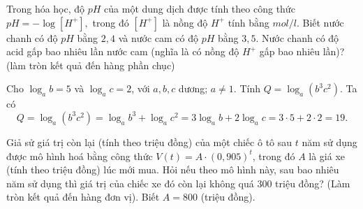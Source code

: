 \begin{bt}%
Trong hóa học, độ $ pH$ của một dung dịch được tính theo công thức $ pH=-\log\left[H^+\right],$ trong đó $\left[H^+\right]$ là nồng độ $H^+$ tính bằng $ mol/l$. Biết nước chanh có độ $ pH$ bằng $ 2{,}4$ và nước cam có độ $ pH$ bằng $ 3{,}5$. Nước chanh có độ acid gấp bao nhiêu lần nước cam (nghĩa là có nồng độ $H^+$ gấp bao nhiêu lần)? (làm tròn kết quả đến hàng phần chục)
\end{bt}

\begin{bt}%
Cho $\log_ab=5$ và $\log_ac=2$, với $ a,b,c$ dương; $ a\ne 1$. Tính $ Q=\log_a\left(b^3c^2\right)$.
\loigiai
{
	Ta có $$ Q=\log_a\left(b^3c^2\right)=\log_a{b^3}+\log_a{c^2}=3\log_ab+2\log_ac=3\cdot 5+2\cdot 2=19.$$}
\end{bt}

\begin{bt}%
Giả sử giá trị còn lại (tính theo triệu đồng) của một chiếc ô tô sau $t$ năm sử dụng được mô hình hoá bằng công thức $V(t)=A \cdot (0{,}905)^t$, trong đó $A$ là giá xe (tính theo triệu đồng) lúc mới mua. Hỏi nếu theo mô hình này, sau bao nhiêu năm sử dụng thì giá trị của chiếc xe đó còn lại không quá $300$ triệu đồng? (Làm tròn kết quả đến hàng đơn vị). Biết $A=800$ (triệu đồng).
\end{bt}

